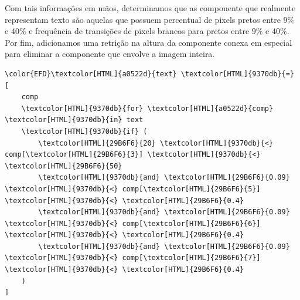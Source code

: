 \documentclass[twocolumn, 10pt]{article}
\begin{document}
Com tais informações em mãos, determinamos que as componente que realmente representam texto são aquelas que possuem percentual de pixels pretos entre \(9\%\) e \(40\%\) e frequência de transições de pixels brancos para pretos entre \(9\%\) e \(40\%\).
Por fim, adicionamos uma retrição na altura da componente conexa em especial para eliminar a componente que envolve a imagem inteira.
\begin{Code}
\begin{Verbatim}
\color{EFD}\textcolor[HTML]{a0522d}{text} \textcolor[HTML]{9370db}{=} [
    comp
    \textcolor[HTML]{9370db}{for} \textcolor[HTML]{a0522d}{comp} \textcolor[HTML]{9370db}{in} text
    \textcolor[HTML]{9370db}{if} (
        \textcolor[HTML]{29B6F6}{20} \textcolor[HTML]{9370db}{<} comp[\textcolor[HTML]{29B6F6}{3}] \textcolor[HTML]{9370db}{<} \textcolor[HTML]{29B6F6}{50}
        \textcolor[HTML]{9370db}{and} \textcolor[HTML]{29B6F6}{0.09} \textcolor[HTML]{9370db}{<} comp[\textcolor[HTML]{29B6F6}{5}] \textcolor[HTML]{9370db}{<} \textcolor[HTML]{29B6F6}{0.4}
        \textcolor[HTML]{9370db}{and} \textcolor[HTML]{29B6F6}{0.09} \textcolor[HTML]{9370db}{<} comp[\textcolor[HTML]{29B6F6}{6}] \textcolor[HTML]{9370db}{<} \textcolor[HTML]{29B6F6}{0.4}
        \textcolor[HTML]{9370db}{and} \textcolor[HTML]{29B6F6}{0.09} \textcolor[HTML]{9370db}{<} comp[\textcolor[HTML]{29B6F6}{7}] \textcolor[HTML]{9370db}{<} \textcolor[HTML]{29B6F6}{0.4}
    )
]
\end{Verbatim}
\end{Code}
\end{document}
